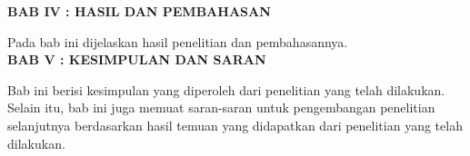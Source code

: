 \noindent
\textbf{BAB IV : HASIL DAN PEMBAHASAN}

Pada bab ini dijelaskan hasil penelitian dan pembahasannya.\\

\noindent
\textbf{BAB V : KESIMPULAN DAN SARAN}

Bab ini berisi kesimpulan yang diperoleh dari penelitian yang telah dilakukan. Selain itu, bab ini juga memuat saran-saran untuk pengembangan penelitian selanjutnya berdasarkan hasil temuan yang didapatkan dari penelitian yang telah dilakukan.\\

\begin{comment}

\end{comment}
